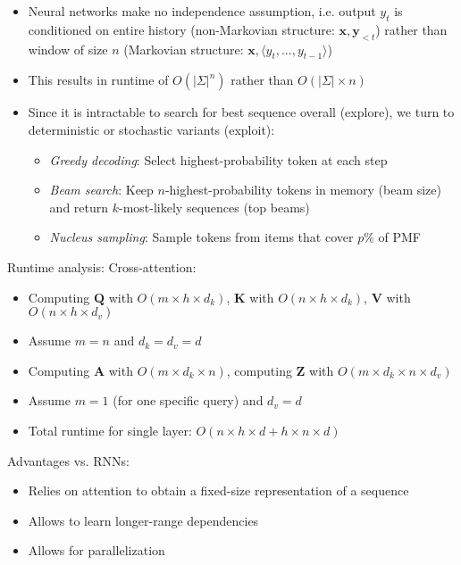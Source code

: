 \begin{itemize}
    \begin{itemize}
        \item Neural networks make no independence assumption, i.e. output $y_t$ is conditioned on entire history (non-Markovian structure: $\boldsymbol{x},\boldsymbol{y}_{<t}$) rather than window of size $n$ (Markovian structure: $\boldsymbol{x},\langle y_t, ..., y_{t-1} \rangle$)
        \item This results in runtime of $O(|\Sigma|^n)$ rather than $O(|\Sigma| \times n)$
        \item Since it is intractable to search for best sequence overall (explore), we turn to deterministic or stochastic variants (exploit): 
        \begin{itemize}
            \item \emph{Greedy decoding}: Select highest-probability token at each step
            \item \emph{Beam search}: Keep $n$-highest-probability tokens in memory (beam size) and return $k$-most-likely sequences (top beams)
            \item \emph{Nucleus sampling}: Sample tokens from items that cover $p\%$ of PMF
        \end{itemize}
    \end{itemize}
\end{itemize}
Runtime analysis: Cross-attention:
\begin{itemize}
    \item Computing $\boldsymbol{Q}$ with $O(m \times h \times d_k)$, $\boldsymbol{K}$ with $O(n \times h \times d_k)$, $\boldsymbol{V}$ with $O(n \times h \times d_v)$
    \item Assume $m = n$ and $d_k = d_v = d$
     \item Computing $\boldsymbol{A}$ with $O(m \times d_k \times n)$, computing $\boldsymbol{Z}$ with $O(m \times d_k \times n \times d_v)$
     \item Assume $m = 1$ (for one specific query) and $d_v = d$
     \item Total runtime for single layer: $O(n \times h \times d + h \times n \times d)$
\end{itemize}
Advantages vs. RNNs:
\begin{itemize}
    \item Relies on attention to obtain a fixed-size representation of a sequence
    \item Allows to learn longer-range dependencies 
    \item Allows for parallelization 
\end{itemize}

